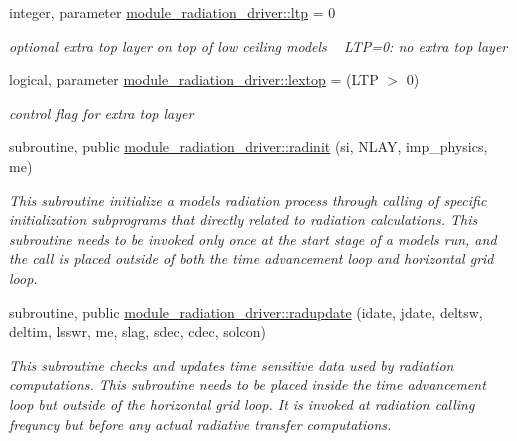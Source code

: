 \begin{DoxyCompactItemize}
\mbox{\label{group__module__radiation__driver_gaab2535e9906afd709124056f4ca1e470}} 
integer, parameter \hyperlink{group__module__radiation__driver_gaab2535e9906afd709124056f4ca1e470}{module\+\_\+radiation\+\_\+driver\+::ltp} = 0
\begin{DoxyCompactList}\small\item\em optional extra top layer on top of low ceiling models ~\newline
 L\+TP=0\+: no extra top layer \end{DoxyCompactList}\item 
\mbox{\label{group__module__radiation__driver_gad27b36d0186c8147fe839eb5c268d157}} 
logical, parameter \hyperlink{group__module__radiation__driver_gad27b36d0186c8147fe839eb5c268d157}{module\+\_\+radiation\+\_\+driver\+::lextop} = (L\+TP $>$ 0)
\begin{DoxyCompactList}\small\item\em control flag for extra top layer \end{DoxyCompactList}\item 
subroutine, public \hyperlink{group__module__radiation__driver_ga3d4ef1d77b7d7ef09fafcb4413e1cbf2}{module\+\_\+radiation\+\_\+driver\+::radinit} (si, N\+L\+AY, imp\+\_\+physics, me)
\begin{DoxyCompactList}\small\item\em This subroutine initialize a model\textquotesingle{}s radiation process through calling of specific initialization subprograms that directly related to radiation calculations. This subroutine needs to be invoked only once at the start stage of a model\textquotesingle{}s run, and the call is placed outside of both the time advancement loop and horizontal grid loop. \end{DoxyCompactList}\end{DoxyCompactItemize}
\begin{DoxyCompactItemize}
\item 
subroutine, public \hyperlink{group__module__radiation__driver_ga28280ee9ea8ee0d183ab9d541a31b718}{module\+\_\+radiation\+\_\+driver\+::radupdate} (idate, jdate, deltsw, deltim, lsswr, me, slag, sdec, cdec, solcon)
\begin{DoxyCompactList}\small\item\em This subroutine checks and updates time sensitive data used by radiation computations. This subroutine needs to be placed inside the time advancement loop but outside of the horizontal grid loop. It is invoked at radiation calling frequncy but before any actual radiative transfer computations. \end{DoxyCompactList}\end{DoxyCompactItemize}
